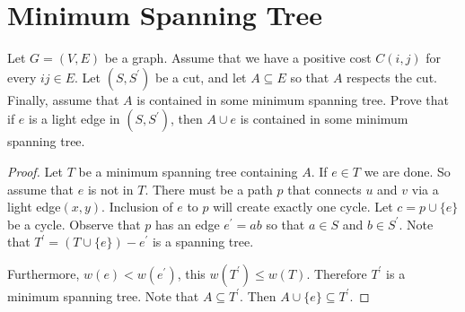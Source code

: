 \documentclass[12pt,twoside,letterpaper]{article}
\begin{document}
\section*{Minimum Spanning Tree}
Let $G=(V,E)$ be a graph. Assume that we have a positive cost $C(i,j)$ for every $ij \in E$. Let $(S,S^\prime)$ be a cut, and let $A \subseteq E$ so that $A$ respects the cut. Finally, assume that $A$ is contained in some minimum spanning tree. Prove that if $e$ is a light edge in $(S,S^\prime)$, then $A \cup e$ is contained in some minimum spanning tree.

\begin{proof}
Let $T$ be a minimum spanning tree containing $A$. If $e \in T$ we are done. So assume that $e$ is not in $T$. There must be a path $p$ that connects $u$ and $v$ via a light edge$(x,y)$. Inclusion of $e$ to $p$ will create exactly one cycle. Let $c=p \cup \{e\}$ be a cycle. Observe that $p$ has an edge $e^\prime=ab$ so that $a \in S$ and $b \in S^\prime$. Note that $T^\prime=(T \cup \{e\})-e^\prime$ is a spanning tree.

Furthermore, $w(e) < w(e^\prime)$, this $w(T^\prime) \le w(T)$. Therefore $T^\prime$ is a minimum spanning tree. Note that $A \subseteq T^\prime$. Then $A \cup \{ e \} \subseteq T^\prime$.

\end{proof}
\end{document}
